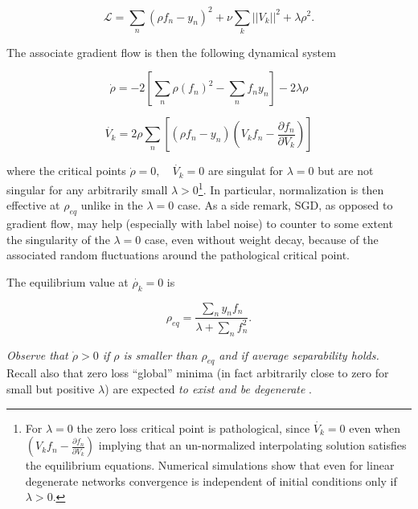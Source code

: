 \documentclass[11pt]{article}
\begin{document}
          \begin{equation}
\mathcal{L}=\sum_n(\rho f_n-y_n)^2 +
\nu \sum_k ||V_k||^2+ \lambda \rho^2.
\label{LagrangianNormalizationRegularization}
\end{equation} 

The associate gradient flow is then the following dynamical system


\begin{equation}
	\dot{\rho}=  -2
        [\sum_n \rho ( f_n)^2- \sum_n f_n y_n] -2 \lambda \rho
        \label{DynSys1}
	\end{equation}

\begin{equation}
	\dot{V_k}= 2 \rho
        \sum_n[(\rho f_n-y_n)  ( V_k f_n - \frac{\partial f_n}{\partial
          V_k})]
                \label{DynSys2}
	\end{equation}

        \noindent where the critical points
        $\dot{\rho}=0, \quad \dot{V_k}=0$ are singulat for $\lambda=0$
        but are not singular for any
        arbitrarily small
        $\lambda>0$\footnote{For $\lambda=0$ the zero loss critical point is
          pathological, since $\dot{V_k}=0$ even when $ ( V_k f_n - \frac{\partial f_n}{\partial
          V_k})$ implying that an un-normalized interpolating solution
        satisfies the equilibrium equations. Numerical simulations
        show that even for  linear degenerate networks convergence
        is independent of initial conditions only if  $\lambda>0$.}.
 In particular, normalization is then effective at
        $\rho_{eq}$ unlike in the $\lambda=0$ case. As a side remark, SGD,
        as opposed to gradient flow, may help (especially
        with label noise) to counter to some extent
        the singularity of the $\lambda=0$ case, even without weight
        decay, because of the associated random fluctuations around
        the pathological critical point.


The equilibrium
       value at  $\dot{\rho_k}=0$   is

        
	\begin{equation}
          \rho_{eq}=\frac{\sum_n y_nf_n} {\lambda +\sum_n f^2_n}.
          \label{lambdaweightdecay}
	\end{equation}


       {\it Observe that $\dot{\rho} >0$ if $\rho$ is smaller than
        $\rho_{eq}$ and if average separability holds.} Recall also
        that zero loss ``global'' minima (in fact arbitrarily close to
        zero for small but positive $\lambda$) are expected {\it to exist and be
        degenerate} \cite{PoggioCooper}.
\end{document}
